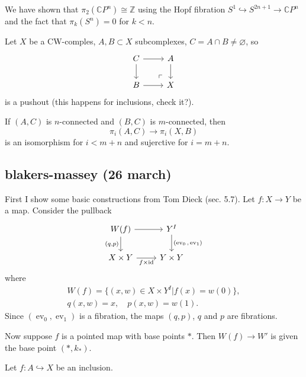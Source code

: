 \documentclass{article}
\newcommand{\C}{\mathbb{C}}
\newcommand{\Z}{\mathbb{Z}}
\DeclareMathOperator{\id}{id}
\DeclareMathOperator{\ev}{ev}
\begin{document}
\begin{example}
	We have shown that $\pi_2(\C P^n)\cong\Z$ using the Hopf fibration $S^1\hookrightarrow S^{2n+1}\to\C P^n$ and the fact that $\pi_k(S^n)=0$ for $k<n$.
\end{example}
\begin{thm}
	Let $X$ be a CW-comples, $A,B\subset X$ subcomplexes, $C=A\cap B\neq\varnothing$, so
	\[\begin{tikzcd}
		C\arrow[r]\arrow[d]&A\arrow[d]\\
		B\arrow[r]&X \arrow[ul, phantom, "\ulcorner", very near start]
	\end{tikzcd}\]
	is a pushout (this happens for inclusions, {\color{orange} check it?}).
	
	If $(A,C)$ is $n$-connected and $(B,C)$ is $m$-connected, then
	\[\pi_i(A,C)\to\pi_i(X,B)\]
	is an isomorphism for $i<m+n$ and sujerctive for $i=m+n$.
\end{thm}

\subsection{blakers-massey (26 march)}
First I show some basic constructions from Tom Dieck (sec. 5.7). Let $f:X\to Y$ be a map. Consider the pullback
\[\begin{tikzcd}
	W(f)\arrow[r]\arrow[d,"(q\text{,}p)",swap]&Y^I\arrow[d,"(\ev_0\text{,}\ev_1)"]\\
	X\times Y\arrow[r,"f\times\id",swap]&Y\times Y
\end{tikzcd}\]
where
\begin{gather*}
	W(f)=\{(x,w)\in X\times Y^I|f(x)=w(0)\},\\
	q(x,w)=x,\quad p(x,w)=w(1).
\end{gather*}
Since $(\ev_0,\ev_1)$ is a fibration, the maps $(q,p)$, $q$ and $p$ are fibrations.

Now suppose $f$ is a pointed map with base points $*$. Then $W(f)\to W'$ is given the base point $(*,k_*)$.

Let $f:A\hookrightarrow X$ be an inclusion.
\end{document}
